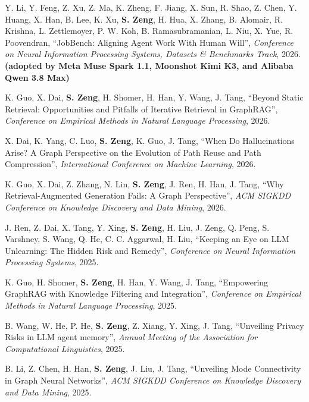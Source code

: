\documentclass[12pt,letterpaper]{article}
\newenvironment{publist}{%
  \begin{list}{}{%
    \setlength{\leftmargin}{34mm}%
    \setlength{\labelwidth}{32mm}%
    \setlength{\labelsep}{2mm}%
    \setlength{\itemsep}{1.5mm}%
    \setlength{\parsep}{0pt}%
    \setlength{\topsep}{1.5mm}%
    \renewcommand{\makelabel}[1]{\bfseries\color{accent}##1\hfill}%
  }}{\end{list}}
\newcommand{\pubgroup}[1]{\vspace{1.5mm}{\bfseries\large\color{accent}#1}\vspace{-0.5mm}}
\begin{document}
\pubgroup{Co-Authored Publications}
\begin{publist}
\item[{[NeurIPS'26]}] Y. Li, Y. Feng, Z. Xu, Z. Ma, K. Zheng, F. Jiang, X. Sun, R. Shao, Z. Chen, Y. Huang, X. Han, B. Lee, K. Xu, \textbf{S. Zeng}, H. Hua, X. Zhang, B. Alomair, R. Krishna, L. Zettlemoyer, P. W. Koh, B. Ramasubramanian, L. Niu, X. Yue, R. Poovendran, ``JobBench: Aligning Agent Work With Human Will'', \textit{Conference on Neural Information Processing Systems, Datasets \& Benchmarks Track}, 2026. \textbf{(adopted by Meta Muse Spark 1.1, Moonshot Kimi K3, and Alibaba Qwen 3.8 Max)}
\item[{[EMNLP'26]}] K. Guo, X. Dai, \textbf{S. Zeng}, H. Shomer, H. Han, Y. Wang, J. Tang, ``Beyond Static Retrieval: Opportunities and Pitfalls of Iterative Retrieval in GraphRAG'', \textit{Conference on Empirical Methods in Natural Language Processing}, 2026.
\item[{[ICML'26]}] X. Dai, K. Yang, C. Luo, \textbf{S. Zeng}, K. Guo, J. Tang, ``When Do Hallucinations Arise? A Graph Perspective on the Evolution of Path Reuse and Path Compression'', \textit{International Conference on Machine Learning}, 2026.
\item[{[KDD'26]}] K. Guo, X. Dai, Z. Zhang, N. Lin, \textbf{S. Zeng}, J. Ren, H. Han, J. Tang, ``Why Retrieval-Augmented Generation Fails: A Graph Perspective'', \textit{ACM SIGKDD Conference on Knowledge Discovery and Data Mining}, 2026.
\item[{[NeurIPS'25]}] J. Ren, Z. Dai, X. Tang, Y. Xing, \textbf{S. Zeng}, H. Liu, J. Zeng, Q. Peng, S. Varshney, S. Wang, Q. He, C. C. Aggarwal, H. Liu, ``Keeping an Eye on LLM Unlearning: The Hidden Risk and Remedy'', \textit{Conference on Neural Information Processing Systems}, 2025.
\item[{[EMNLP'25]}] K. Guo, H. Shomer, \textbf{S. Zeng}, H. Han, Y. Wang, J. Tang, ``Empowering GraphRAG with Knowledge Filtering and Integration'', \textit{Conference on Empirical Methods in Natural Language Processing}, 2025.
\item[{[ACL'25]}] B. Wang, W. He, P. He, \textbf{S. Zeng}, Z. Xiang, Y. Xing, J. Tang, ``Unveiling Privacy Risks in LLM agent memory'', \textit{Annual Meeting of the Association for Computational Linguistics}, 2025.
\item[{[KDD'25]}] B. Li, Z. Chen, H. Han, \textbf{S. Zeng}, J. Liu, J. Tang, ``Unveiling Mode Connectivity in Graph Neural Networks'', \textit{ACM SIGKDD Conference on Knowledge Discovery and Data Mining}, 2025.

\end{publist}
\end{document}
